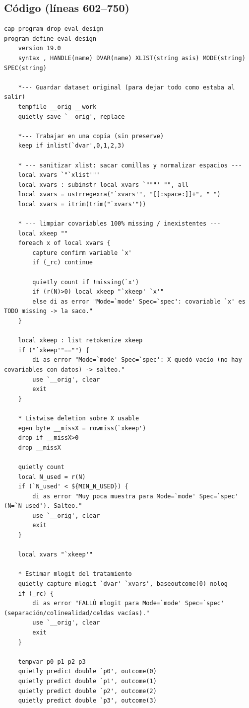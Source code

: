 \documentclass[12pt]{article}
\begin{document}
\subsection*{Código (líneas 602--750)}
\begin{lstlisting}
cap program drop eval_design
program define eval_design
    version 19.0
    syntax , HANDLE(name) DVAR(name) XLIST(string asis) MODE(string) SPEC(string)

    *--- Guardar dataset original (para dejar todo como estaba al salir)
    tempfile __orig __work
    quietly save `__orig', replace

    *--- Trabajar en una copia (sin preserve)
    keep if inlist(`dvar',0,1,2,3)

    * --- sanitizar xlist: sacar comillas y normalizar espacios ---
    local xvars `"`xlist'"'
    local xvars : subinstr local xvars `"""' "", all
    local xvars = ustrregexra("`xvars'", "[[:space:]]+", " ")
    local xvars = itrim(trim("`xvars'"))

    * --- limpiar covariables 100% missing / inexistentes ---
    local xkeep ""
    foreach x of local xvars {
        capture confirm variable `x'
        if (_rc) continue

        quietly count if !missing(`x')
        if (r(N)>0) local xkeep "`xkeep' `x'"
        else di as error "Mode=`mode' Spec=`spec': covariable `x' es TODO missing -> la saco."
    }

    local xkeep : list retokenize xkeep
    if ("`xkeep'"=="") {
        di as error "Mode=`mode' Spec=`spec': X quedó vacío (no hay covariables con datos) -> salteo."
        use `__orig', clear
        exit
    }

    * Listwise deletion sobre X usable
    egen byte __missX = rowmiss(`xkeep')
    drop if __missX>0
    drop __missX

    quietly count
    local N_used = r(N)
    if (`N_used' < ${MIN_N_USED}) {
        di as error "Muy poca muestra para Mode=`mode' Spec=`spec' (N=`N_used'). Salteo."
        use `__orig', clear
        exit
    }

    local xvars "`xkeep'"

    * Estimar mlogit del tratamiento
    quietly capture mlogit `dvar' `xvars', baseoutcome(0) nolog
    if (_rc) {
        di as error "FALLÓ mlogit para Mode=`mode' Spec=`spec' (separación/colinealidad/celdas vacías)."
        use `__orig', clear
        exit
    }

    tempvar p0 p1 p2 p3
    quietly predict double `p0', outcome(0)
    quietly predict double `p1', outcome(1)
    quietly predict double `p2', outcome(2)
    quietly predict double `p3', outcome(3)


\end{lstlisting}
\end{document}
